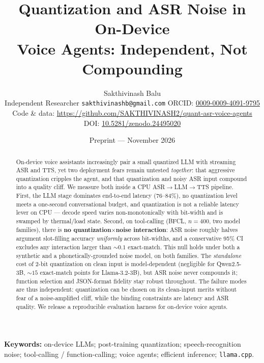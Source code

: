 \documentclass[11pt]{article}
\title{\bfseries Quantization and ASR Noise in On-Device\\
Voice Agents: Independent, Not Compounding}
\author{Sakthivinash Balu\\
\small Independent Researcher \quad\texttt{sakthivinashb@gmail.com} \quad ORCID: \href{https://orcid.org/0009-0009-4091-9795}{0009-0009-4091-9795}\\
\small Code \& data: \url{https://github.com/SAKTHIVINASH2/quant-asr-voice-agents}\\
\small DOI: \href{https://doi.org/10.5281/zenodo.24495020}{10.5281/zenodo.24495020}}
\date{Preprint --- November 2026}
\newcommand{\code}[1]{\texttt{#1}}
\begin{document}
\maketitle

\begin{abstract}
On-device voice assistants increasingly pair a small quantized LLM with streaming
ASR and TTS, yet two deployment fears remain untested \emph{together}: that
aggressive quantization cripples the agent, and that quantization and noisy ASR
input compound into a quality cliff. We measure both inside a CPU
ASR$\rightarrow$LLM$\rightarrow$TTS pipeline. First, the LLM stage dominates
end-to-end latency (76--84\%), no quantization level meets a one-second
conversational budget, and quantization is not a reliable latency lever on CPU ---
decode speed varies non-monotonically with bit-width and is swamped by thermal/load
state. Second, on tool-calling (BFCL, $n{=}400$, two model families), there is
\textbf{no quantization$\times$noise interaction}: ASR noise roughly halves argument
slot-filling accuracy \emph{uniformly} across bit-widths, and a conservative 95\% CI
excludes any interaction larger than ${\sim}0.1$ exact-match. This null holds under
both a synthetic and a phonetically-grounded noise model, on both families. The
\emph{standalone} cost of 2-bit quantization on clean input is model-dependent
(negligible for Qwen2.5-3B, ${\sim}15$ exact-match points for Llama-3.2-3B), but ASR
noise never compounds it; function selection and JSON-format fidelity stay robust
throughout. The failure modes are thus independent: quantization can be chosen on its
clean-input merits without fear of a noise-amplified cliff, while the binding
constraints are latency and ASR quality. We release a reproducible evaluation harness
for on-device voice agents.
\end{abstract}

\noindent\textbf{Keywords:} on-device LLMs; post-training quantization;
speech-recognition noise; tool-calling / function-calling; voice agents; efficient
inference; \code{llama.cpp}.
\end{document}
